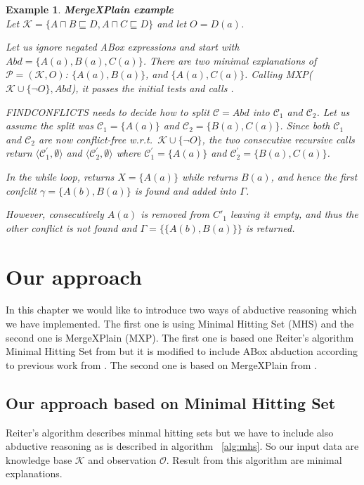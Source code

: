 \documentclass[12pt,a4paper]{article}
\newtheorem{example}{Example}[subsection]
\begin{document}
\begin{example}{\textbf{MergeXPlain example}}
	\\
	Let $\mathcal{K} = \{ A \sqcap B \sqsubseteq D, A \sqcap C \sqsubseteq D\}$ and let $O = D(a)$. 
	
	Let us ignore negated ABox expressions and start with $Abd = \{ A(a), B(a),
	C(a)\}$. There are two minimal explanations of $\mathcal{P} = (\mathcal{K},O)$: $\{A(a),B(a)\}$, and	$\{A(a),C(a)\}$. Calling MXP($\mathcal{K} \cup \{\neg O\}, Abd$), it passes the
	initial tests and calls .

	\textsc{FINDCONFLICTS} needs to decide how to split $\mathcal{C} = Abd$ into $\mathcal{C}_{1}$
	and $\mathcal{C}_{2}$. Let us assume the split was $\mathcal{C}_{1} = \{A(a)\}$ and $\mathcal{C}_{2} =
	\{B(a),C(a)\}$. Since both $\mathcal{C}_{1}$ and $\mathcal{C}_{2}$ are now conflict-free w.r.t.\
	$\mathcal{K} \cup \{\neg O\}$, the two consecutive recursive calls return
	$\langle \mathcal{C}^{\prime}_{1},\emptyset \rangle$ and $\langle \mathcal{C}^{\prime}_{2},\emptyset \rangle$ where
	$\mathcal{C}^{\prime}_{1}=\{A(a)\}$ and $\mathcal{C}^{\prime}_{2}=\{B(a),C(a)\}$.
	
	In the while loop, \Call{GETCONFLICT}{$\mathcal{K} \cup \{\neg O\}\cup
		\{B(a),C(a)\},$ $\{B(a),C(a)\},$ $\{A(a)\}$} returns $X = \{A(a)\}$ while
	 returns $B(a)$, and hence the first
	confclit $\gamma = \{A(b),B(a)\}$ is found and added into $\Gamma$.
	
	However, consecutively $A(a)$ is removed from $C'_1$ leaving it empty,
	and thus the other conflict is not found and $\Gamma = \{\{A(b),B(a)\}\}$ is
	returned.	
\end{example}

\section{Our approach}
In this chapter we would like to introduce two ways of abductive reasoning which we have implemented. The first one is using Minimal Hitting Set (MHS) and the second one is MergeXPlain (MXP). The first one is based one Reiter's algorithm Minimal Hitting Set from \citep{reiterHS} but it is modified to include ABox abduction according to previous work from \citep{pukancovaPreliminaryReport}. The second one is based on MergeXPlain from \citep{MXP}.

\subsection{Our approach based on Minimal Hitting Set}
Reiter's algorithm describes minmal hitting sets but we have to include also abductive reasoning as is described in algorithm ~\ref{alg:mhs}. So our input data are knowledge base $\mathcal{K}$ and observation $\mathcal{O}$. Result from this algorithm are minimal explanations.
\end{document}
